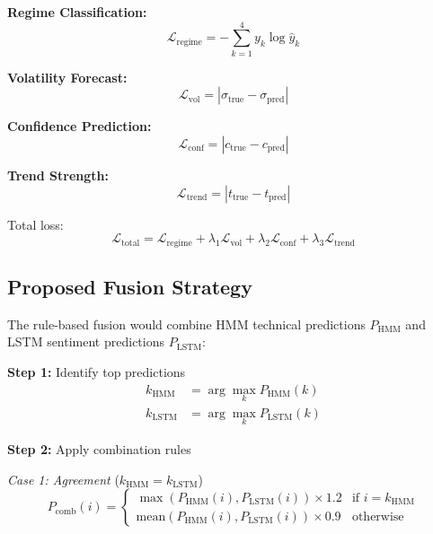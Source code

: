 \documentclass[conference]{IEEEtran}
\begin{document}
\textbf{Regime Classification:}
\begin{equation}
\mathcal{L}_{\text{regime}} = -\sum_{k=1}^{4}y_k\log\hat{y}_k
\end{equation}

\textbf{Volatility Forecast:}
\begin{equation}
\mathcal{L}_{\text{vol}} = |\sigma_{\text{true}} - \sigma_{\text{pred}}|
\end{equation}

\textbf{Confidence Prediction:}
\begin{equation}
\mathcal{L}_{\text{conf}} = |c_{\text{true}} - c_{\text{pred}}|
\end{equation}

\textbf{Trend Strength:}
\begin{equation}
\mathcal{L}_{\text{trend}} = |t_{\text{true}} - t_{\text{pred}}|
\end{equation}

Total loss:
\begin{equation}
\mathcal{L}_{\text{total}} = \mathcal{L}_{\text{regime}} + \lambda_1\mathcal{L}_{\text{vol}} + \lambda_2\mathcal{L}_{\text{conf}} + \lambda_3\mathcal{L}_{\text{trend}}
\end{equation}

\subsection{Proposed Fusion Strategy}

The rule-based fusion would combine HMM technical predictions $P_{\text{HMM}}$ and LSTM sentiment predictions $P_{\text{LSTM}}$:

\textbf{Step 1:} Identify top predictions
\begin{equation}
\begin{aligned}
k_{\text{HMM}} &= \arg\max_k P_{\text{HMM}}(k) \\
k_{\text{LSTM}} &= \arg\max_k P_{\text{LSTM}}(k)
\end{aligned}
\end{equation}

\textbf{Step 2:} Apply combination rules

\textit{Case 1: Agreement} ($k_{\text{HMM}} = k_{\text{LSTM}}$)
\begin{equation}
P_{\text{comb}}(i) = \begin{cases}
\max(P_{\text{HMM}}(i), P_{\text{LSTM}}(i)) \times 1.2 & \text{if } i = k_{\text{HMM}} \\
\text{mean}(P_{\text{HMM}}(i), P_{\text{LSTM}}(i)) \times 0.9 & \text{otherwise}
\end{cases}
\end{equation}
\end{document}
